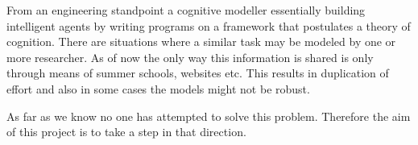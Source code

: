 \begin{itemize}


\end{itemize}


From an engineering standpoint a cognitive modeller essentially
building intelligent agents by writing programs on a framework that
postulates a theory of cognition. There are situations where a similar
task may be modeled by one or more researcher. As of now the only
way this information is shared is only through means of summer
schools, websites etc. This results in duplication of effort and also
in some cases the models might not be robust.

As far as we know no one has attempted to solve this
problem. Therefore the aim of this project is to take a step in that
direction.

